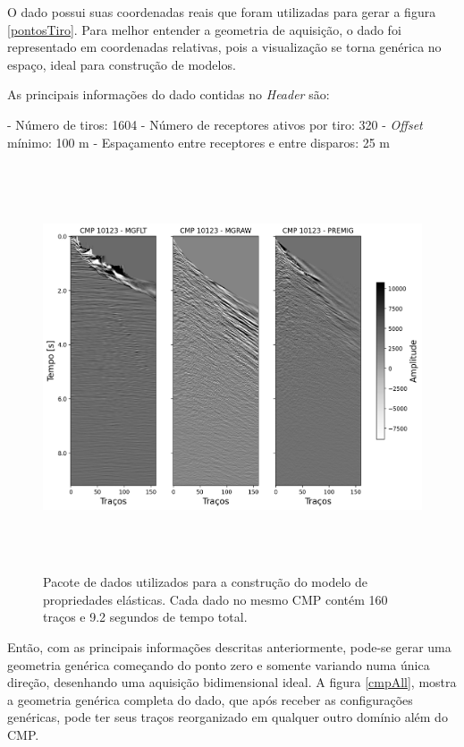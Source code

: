 \documentclass[
	12pt,				%
	openright,			%
	oneside,			%
	a4paper,			%
	english,			%
	brazil				%
	]{abntex2}
\begin{document}
    O dado possui suas coordenadas reais que foram utilizadas para gerar a figura \ref{pontosTiro}. Para melhor entender a geometria de aquisição, o dado foi representado em coordenadas relativas, pois a visualização se torna genérica no espaço, ideal para construção de modelos. 
    
    \newpage
    \noindent As principais informações do dado contidas no \textit{Header} são:
    
    \noindent - Número de tiros: 1604 \newline 
    \noindent - Número de receptores ativos por tiro: 320 \newline
    \noindent - \textit{Offset} mínimo: 100 m \newline
    \noindent - Espaçamento entre receptores e entre disparos: 25 m \newline    
        
    \begin{figure}[htp!]
		\centering
		\includegraphics[width=15cm,height=12cm]{../imagens/seismograms.png}
		\caption{Pacote de dados utilizados para a construção do modelo de propriedades elásticas. Cada dado no mesmo CMP contém 160 traços e 9.2 segundos de tempo total.}
		\label{seismEngland}
	\end{figure}
	
	Então, com as principais informações descritas anteriormente, pode-se gerar uma geometria genérica começando do ponto zero e somente variando numa única direção, desenhando uma aquisição bidimensional ideal. A figura \ref{cmpAll}, mostra a geometria genérica completa do dado, que após receber as configurações genéricas, pode ter seus traços reorganizado em qualquer outro domínio além do CMP.  
\end{document}
